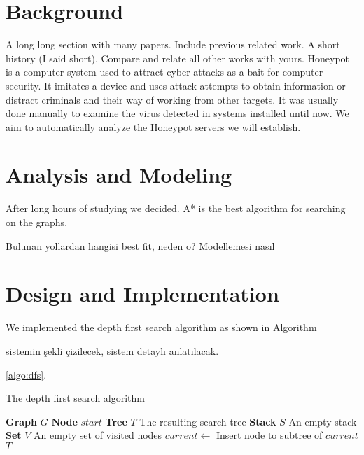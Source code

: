 \documentclass[a4paper, 12pt]{article}
\begin{document}
\newpage
\section{Background}
A long long section with many papers. Include previous related work. A short history (I said short). Compare and relate all other works with yours.
Honeypot is a computer system used to attract cyber attacks as a bait for computer security. It imitates a device and uses attack attempts to obtain information or distract criminals and their way of working from other targets. It was usually done manually to examine the virus detected in systems installed until now. We aim to automatically analyze the Honeypot servers we will establish.

\newpage
\section{Analysis and Modeling}
After long hours of studying we decided. A* is the best algorithm for searching on the graphs.

Bulunan yollardan hangisi best fit, neden o? Modellemesi nasıl

\newpage
\section{Design and Implementation}
We implemented the depth first search algorithm as shown in Algorithm

sistemin şekli çizilecek, sistem detaylı anlatılacak.

\ref{algo:dfs}.
\begin{algorithm}[H]
    \caption{The depth first search algorithm}
    \label{algo:dfs}
    \begin{algorithmic}[1]
        \State \textbf{Graph} $G$
        \State \textbf{Node} $start$
        \State \textbf{Tree} $ T $ \Comment The resulting search tree
        \State \textbf{Stack} $ S $ \Comment An empty stack
        \State \textbf{Set} $ V $ \Comment An empty set of visited nodes
        \State {}
        \State {}
        \State $current \gets$ 
        \State {}
        \State {}
        \State {}
        \Comment Insert node to subtree of $ current $
        \EndFor
        \EndIf
        \EndWhile
        \State \Return $ T $
        \EndFunction
    \end{algorithmic}
\end{algorithm}
\end{document}
